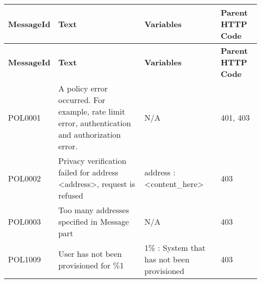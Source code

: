 \begin{longtable}{|>{\raggedright}p{}|>{\raggedright}p{}|>{\raggedright}p{}|>{\raggedright}p{}|}
\hline
\hline 
\textbf{\footnotesize{MessageId}} & \textbf{\footnotesize{Text}} & \textbf{\footnotesize{Variables}} & \textbf{\footnotesize{Parent HTTP Code}}\tabularnewline
\hline 
\hline
\endfirsthead
\hline
\hline 
\textbf{\footnotesize{MessageId}} & \textbf{\footnotesize{Text}} & \textbf{\footnotesize{Variables}} & \textbf{\footnotesize{Parent HTTP Code}}\tabularnewline
\hline 
\hline
\endhead
\hline 
{\footnotesize{POL0001}} & {\footnotesize{A policy error occurred. For example, rate limit error,
authentication and authorization error.}} & {\footnotesize{N/A}} & {\footnotesize{401, 403}}\tabularnewline
\hline 
{\footnotesize{POL0002}} & {\footnotesize{Privacy verification failed for address <address>,
request is refused}} & {\footnotesize{address : <content\_here>}} & {\footnotesize{403}}\tabularnewline
\hline 
{\footnotesize{POL0003}} & {\footnotesize{Too many addresses specified in Message part}} & {\footnotesize{N/A}} & {\footnotesize{403}}\tabularnewline
\hline 
{\footnotesize{POL1009}} & {\footnotesize{User has not been provisioned for \%1}} & {\footnotesize{1\% : System that has not been provisioned}} & {\footnotesize{403}}\tabularnewline
\hline 
\end{longtable}
